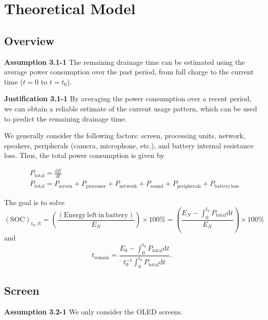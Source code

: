 \documentclass[12pt]{article}
\begin{document}
\section{Theoretical Model}

\subsection{Overview}

\noindent \textbf{Assumption 3.1-1} \quad The remaining drainage time can be estimated using the average power consumption over the past period, from full charge to the current time ($t=0$ to $t=t_0$). 

\noindent \textbf{Justification 3.1-1} \quad By averaging the power consumption over a recent period, we can obtain a reliable estimate of the current usage pattern, which can be used to predict the remaining drainage time.
\\
\par We generally consider the following factors: screen, processing units, network, speakers, peripherals (camera, microphone, etc.), and battery internal resistance loss. Thus, the total power consumption is given by

\begin{eqnarray}
	& P_\mathrm{total}=\frac{\mathrm dE}{\mathrm dt} \\
	& P_\mathrm{total}=P_\mathrm{screen}+P_\mathrm{processor}+P_\mathrm{network}+P_\mathrm{sound}+P_\mathrm{peripherals}+P_\mathrm{battery\,loss}
\end{eqnarray}

The goal is to solve
\begin{equation}
	(\mathrm{SOC})_{t_0,N}=\left(\frac{(\mathrm{Energy\,left\,in\,battery})}{E_N}\right)\times 100\%=\left(\frac{E_N-\int_0^{t_0} P_\mathrm{total}\mathrm dt}{E_N}\right)\times 100\%
\end{equation}
and
\begin{equation}
	t_\mathrm{remain}=\frac{E_0-\int_0^{t_0} P_\mathrm{total}\mathrm dt}{t_0^{-1}\int_0^{t_0}P_\mathrm{total}\mathrm dt}.
\end{equation}

\subsection{Screen}

\noindent \textbf{Assumption 3.2-1} \quad We only consider the OLED screens.
\end{document}
